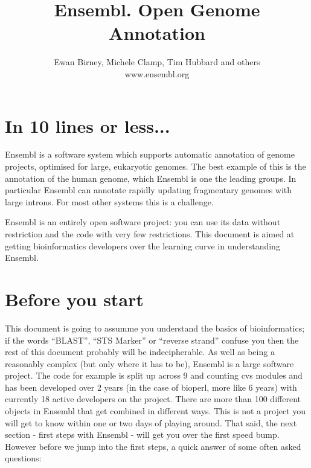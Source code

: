 \documentclass[11pt,a4paper]{article}
\begin{document}
\title{Ensembl. Open Genome Annotation}
\author{Ewan Birney, Michele Clamp, Tim Hubbard and others\\www.ensembl.org}


\maketitle
 
\newpage

\section{In 10 lines or less...}

Ensembl is a software system which supports automatic annotation of
genome projects, optimised for large, eukaryotic genomes. The best
example of this is the annotation of the human genome, which Ensembl
is one the leading groups. In particular Ensembl can annotate rapidly
updating fragmentary genomes with large introns. For most other systems
this is a challenge.

Ensembl is an entirely open software project: you can use its data
without restriction and the code with very few restrictions. This
document is aimed at getting bioinformatics developers over the
learning curve in understanding Ensembl.

\section{Before you start}

This document is going to assumme you understand the basics of
bioinformatics; if the words ``BLAST'', ``STS Marker'' or ``reverse
strand'' confuse you then the rest of this document probably will be
indecipherable. As well as being a reasonably complex (but only where
it has to be), Ensembl is a large software project. The code for
example is split up across 9 and counting cvs modules and has been
developed over 2 years (in the case of bioperl, more like 6 years)
with currently 18 active developers on the project. There are more
than 100 different objects in Ensembl that get combined in different
ways.  This is not a project you will get to know within one or two
days of playing around. That said, the next section - first steps with
Ensembl - will get you over the first speed bump. However before we
jump into the first steps, a quick answer of some often asked
questions:
\end{document}
